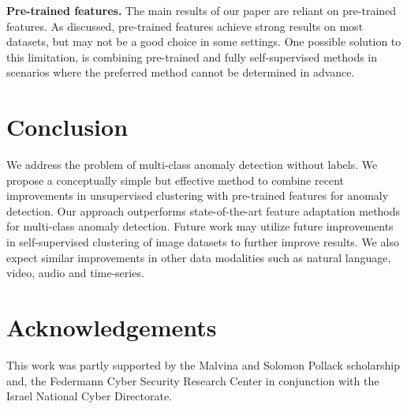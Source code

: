 \documentclass[runningheads]{llncs}
\begin{document}
\textbf{Pre-trained features.} The main results of our paper are reliant on pre-trained features. As discussed, pre-trained features achieve strong results on most datasets, but may not be a good choice in some settings. One possible solution to this limitation, is combining pre-trained and fully self-supervised methods in scenarios where the preferred method cannot be determined in advance.

\section{Conclusion}
We address the problem of multi-class anomaly detection without labels. We propose a conceptually simple but effective method to combine recent improvements in unsupervised clustering with pre-trained features for anomaly detection. Our approach outperforms state-of-the-art feature adaptation methods for multi-class anomaly detection. Future work may utilize future improvements in self-supervised clustering of image datasets to further improve results. We also expect similar improvements in other data modalities such as natural language, video, audio and time-series.

\section{Acknowledgements}
This work was partly supported by the Malvina and Solomon Pollack scholarship and, the Federmann Cyber Security Research
Center in conjunction with the Israel National Cyber Directorate.

\clearpage


\end{document}
